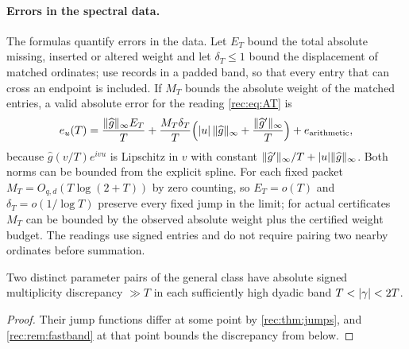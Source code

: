 \paragraph{Errors in the spectral data.}
The formulas quantify errors in the data. Let $E_T$ bound the total absolute missing,
inserted or altered weight and let $\delta_T\le1$ bound the displacement of matched
ordinates; use records in a padded band, so that every entry that can cross an endpoint is
included. If $M_T$ bounds the absolute weight of the matched entries, a valid absolute error
for the reading \eqref{rec:eq:AT} is
\begin{equation}\label{rec:eq:noise}
 e_u(T)=\frac{\lVert\widehat g\rVert_\infty E_T}T+\frac{M_T\delta_T}T
 \Bigl(\lvert u\rvert\,\lVert\widehat g\rVert_\infty+\frac{\lVert\widehat g'\rVert_\infty}T\Bigr)
 +e_{\mathrm{arithmetic}},
\end{equation}
because $\widehat g(v/T)e^{ivu}$ is Lipschitz in $v$ with constant
$\lVert\widehat g'\rVert_\infty/T+\lvert u\rvert\lVert\widehat g\rVert_\infty$. Both norms can be bounded from
the explicit spline. For each fixed packet $M_T=O_{q,d}(T\log(2+T))$ by zero counting, so
$E_T=o(T)$ and $\delta_T=o(1/\log T)$ preserve every fixed jump in the limit; for actual
certificates $M_T$ can be bounded by the observed absolute weight plus the certified weight
budget. The readings use signed entries and do not require pairing two nearby ordinates
before summation.

\begin{corollary}[\stG]\label{rec:cor:discrepancy}
Two distinct parameter pairs of the general class have absolute signed multiplicity
discrepancy $\gg T$ in each sufficiently high dyadic band $T<\lvert\gamma\rvert<2T$.
\end{corollary}
\begin{proof}
Their jump functions differ at some point by \cref{rec:thm:jumps}, and \cref{rec:rem:fastband}
at that point bounds the discrepancy from below.
\end{proof}

